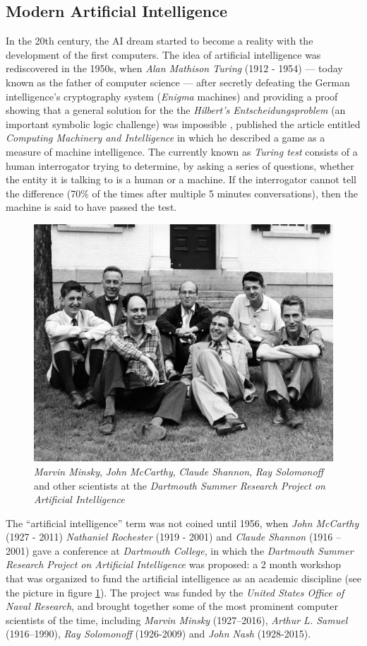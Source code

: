 \subsection{Modern Artificial Intelligence}
In the 20th century, the AI dream started to become a reality with the development of the first computers. The idea of artificial intelligence was rediscovered in the 1950s, when \textit{Alan Mathison Turing} (1912 - 1954) — today known as the father of computer science — after secretly defeating the German intelligence's cryptography system (\textit{Enigma} machines) \cite{Hodges:2000} and providing a proof showing that a general solution for the the \textit{Hilbert's Entscheidungsproblem} (an important symbolic logic challenge) was impossible \cite{turing1936}, published the article entitled \textit{Computing Machinery and Intelligence} \cite{turing1950} in which he described a game as a measure of machine intelligence. The currently known as \textit{Turing test} consists of a human interrogator trying to determine, by asking a series of questions, whether the entity it is talking to is a human or a machine. If the interrogator cannot tell the difference (70\% of the times after multiple 5 minutes conversations), then the machine is said to have passed the test.

\begin{figure}
	\centering
	\includegraphics[width=.6\textwidth]{chapter1/images/dartmouth}
	\caption{\textit{Marvin Minsky}, \textit{John McCarthy}, \textit{Claude Shannon}, \textit{Ray Solomonoff} and other scientists at the \textit{Dartmouth Summer Research Project on Artificial Intelligence}}
	\label{fig:dartmouth_photo}
\end{figure}

The ``artificial intelligence'' term was not coined until 1956, when \textit{John McCarthy} (1927 - 2011) \textit{Nathaniel Rochester} (1919 - 2001) and \textit{Claude Shannon} (1916 – 2001) gave a conference at \textit{Dartmouth College}, in which the \textit{Dartmouth Summer Research Project on Artificial Intelligence} was proposed: a 2 month workshop that was organized to fund the artificial intelligence as an academic discipline (see the picture in figure \ref{fig:dartmouth_photo}). The project was funded by the \textit{United States Office of Naval Research}, and brought together some of the most prominent computer scientists of the time, including \textit{Marvin Minsky} (1927–2016), \textit{Arthur L. Samuel} (1916–1990), \textit{Ray Solomonoff} (1926-2009) and \textit{John Nash} (1928-2015).

